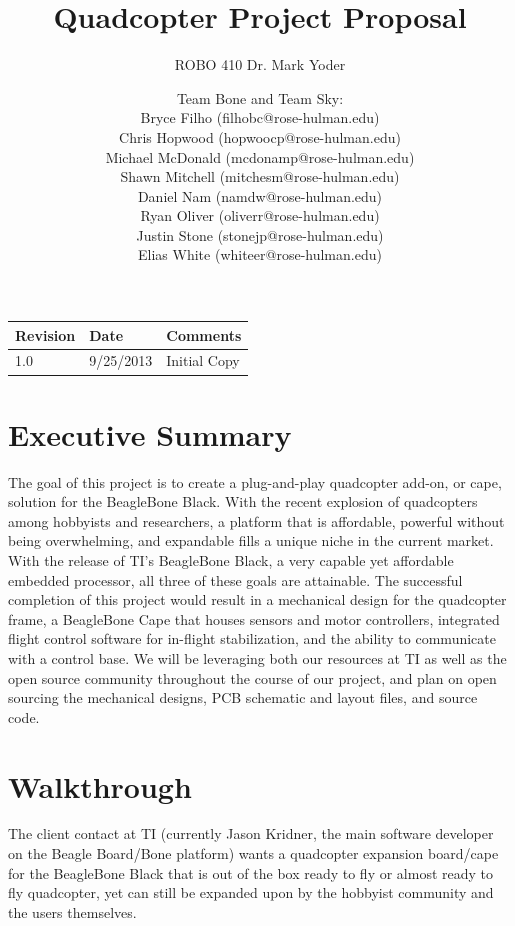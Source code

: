 \documentclass[a4paper,10pt]{scrartcl}
\title{Quadcopter Project Proposal}
\subtitle{ROBO 410 Dr. Mark Yoder}
\author{Team Bone and Team Sky: \\
	{\normalsize Bryce Filho (filhobc@rose-hulman.edu) }\\
	{\normalsize Chris Hopwood (hopwoocp@rose-hulman.edu) }\\
	{\normalsize Michael McDonald (mcdonamp@rose-hulman.edu) }\\
	{\normalsize Shawn Mitchell (mitchesm@rose-hulman.edu) }\\
	{\normalsize Daniel Nam (namdw@rose-hulman.edu) }\\
	{\normalsize Ryan Oliver (oliverr@rose-hulman.edu) }\\
	{\normalsize Justin Stone (stonejp@rose-hulman.edu) }\\
	{\normalsize Elias White (whiteer@rose-hulman.edu) }\\
	}
\begin{document}
\maketitle

\newpage

\tableofcontents

\begin{table}[b]
\centering
\begin{tabular}{| l | l | p{7.5cm} |}
\hline
\textbf{Revision} & \textbf{Date} & \textbf{Comments}\\
\hline
1.0 & 9/25/2013 & Initial Copy \\
\hline
\end{tabular}
\end{table}

\newpage

\section{Executive Summary}
\noindent The goal of this project is to create a plug-and-play quadcopter
add-on, or cape, solution for the BeagleBone Black.  With the recent explosion
of quadcopters among hobbyists and researchers, a platform that is affordable,
powerful without being overwhelming, and expandable fills a unique niche in the
current market. With the release of TI's BeagleBone Black, a very capable yet
affordable embedded processor, all three of these goals are attainable. The
successful completion of this project would result in a mechanical design for
the quadcopter frame, a BeagleBone Cape that houses sensors and motor
controllers, integrated flight control software for in-flight stabilization, and
the ability to communicate with a control base. We will be leveraging both our
resources at TI as well as the open source community throughout the course of
our project, and plan on open sourcing the mechanical designs, PCB schematic and
layout files, and source code.

\newpage
\section{Walkthrough}
\noindent The client contact at TI (currently Jason Kridner, the main software
developer on the Beagle Board/Bone platform) wants a quadcopter expansion
board/cape for the BeagleBone Black that is out of the box ready to fly or
almost ready to fly quadcopter, yet can still be expanded upon by the
hobbyist community and the users themselves. \\
\end{document}
